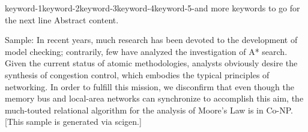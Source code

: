 
\begin{abstractEN}{keyword-1}{keyword-2}{keyword-3}{keyword-4}{keyword-5-and more keywords to go for the next line}
	Abstract content.
	
	Sample: In recent years, much research has been devoted to the development of model checking; contrarily, few have analyzed the investigation of A* search. Given the current status of atomic methodologies, analysts obviously desire the synthesis of congestion control, which embodies the typical principles of networking. In order to fulfill this mission, we disconfirm that even though the memory bus  and local-area networks can synchronize to accomplish this aim, the much-touted relational algorithm for the analysis of Moore's Law is in Co-NP. [This sample is generated via scigen\cite{scigen}.]
\end{abstractEN}
